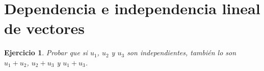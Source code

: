 \documentclass[a4paper,10pt]{book}
\newtheorem*{ejercicio}{Ejercicio}
\begin{document}
\section*{Dependencia e independencia lineal de vectores}

\begin{ejercicio}Probar que si $u_1$, $u_2$ y $u_3$ son independientes, también lo son $u_1+u_2$, $u_2+u_3$ y $u_1+u_3$.

\end{ejercicio}
\end{document}

